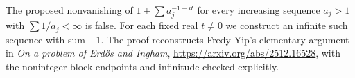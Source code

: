 The proposed nonvanishing of $1+\sum a_j^{-1-it}$ for every increasing sequence $a_j>1$ with $\sum1/a_j<\infty$ is false. For each fixed real $t\ne0$ we construct an infinite such sequence with sum $-1$. The proof reconstructs Fredy Yip's elementary argument in \emph{On a problem of Erd\H{o}s and Ingham}, \url{https://arxiv.org/abs/2512.16528}, with the noninteger block endpoints and infinitude checked explicitly.
